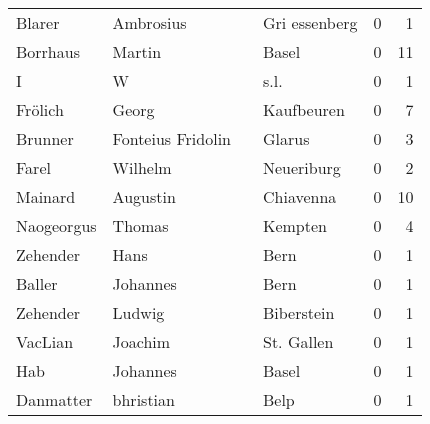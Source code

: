 \begin{center}
\begin{tiny}
\begin{longtabu}{llllrr}
                   Blarer &                          Ambrosius &             &                               Gri essenberg &          0 &         1 \\
                 Borrhaus &                             Martin &             &                                       Basel &          0 &        11 \\
                        I &                                  W &             &                                        s.l. &          0 &         1 \\
                  Frölich &                              Georg &             &                                  Kaufbeuren &          0 &         7 \\
                  Brunner &                  Fonteius Fridolin &             &                                      Glarus &          0 &         3 \\
                    Farel &                            Wilhelm &             &                                  Neueriburg &          0 &         2 \\
                  Mainard &                           Augustin &             &                                   Chiavenna &          0 &        10 \\
               Naogeorgus &                             Thomas &             &                                     Kempten &          0 &         4 \\
                 Zehender &                               Hans &             &                                        Bern &          0 &         1 \\
                   Baller &                           Johannes &             &                                        Bern &          0 &         1 \\
                 Zehender &                             Ludwig &             &                                  Biberstein &          0 &         1 \\
                  VacLian &                            Joachim &             &                                  St. Gallen &          0 &         1 \\
                      Hab &                           Johannes &             &                                       Basel &          0 &         1 \\
                Danmatter &                          bhristian &             &                                        Belp &          0 &         1 \\

\end{longtabu}
\end{tiny}
\end{center}
